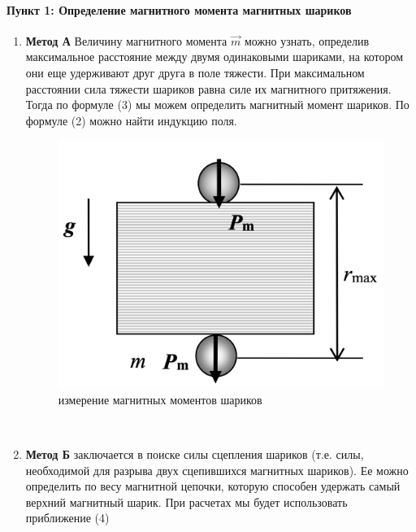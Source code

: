 \documentclass[a4paper,12pt]{article}
\begin{document}
\paragraph{Пункт 1: Определение магнитного момента магнитных шариков}
\begin{enumerate}
\itemsep0em
\item \textbf{Метод А}
Величину магнитного момента $\overrightarrow{m}$ можно узнать, определив максимальное расстояние между двумя одинаковыми шариками, на котором они еще удерживают друг друга в поле тяжести. При максимальном расстоянии сила тяжести шариков равна силе их магнитного притяжения. Тогда по формуле (3) мы можем определить магнитный момент шариков. По формуле (2) можно найти индукцию поля.
\begin{figure}[h!]
\centering
\includegraphics[scale=0.25]{ris1.png} 
\caption{измерение магнитных моментов шариков}
\end{figure} \\
\item \textbf{Метод Б} заключается в поиске силы сцепления шариков (т.е. силы, необходимой для разрыва двух сцепившихся магнитных шариков). Ее можно определить по весу магнитной цепочки, которую способен удержать самый верхний магнитный шарик. При расчетах мы будет использовать приближение (4)
\begin{figure}[h!]
\centering

\end{figure}
\end{enumerate}
\end{document}

